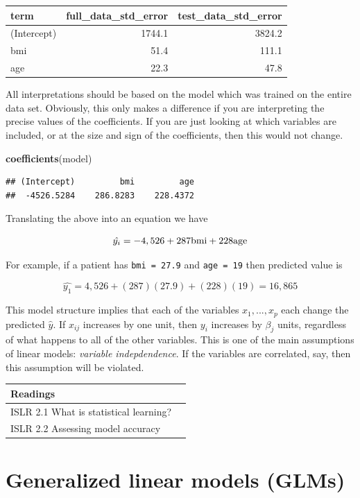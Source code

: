 \documentclass[openany]{book}
\newenvironment{Shaded}{\begin{snugshade}}{\end{snugshade}}
\newcommand{\KeywordTok}[1]{\textcolor[rgb]{0.13,0.29,0.53}{\textbf{#1}}}
\newcommand{\NormalTok}[1]{#1}
\begin{document}
\begin{longtable}[]{@{}lrr@{}}
\toprule
term & full\_data\_std\_error & test\_data\_std\_error\tabularnewline
\midrule
\endhead
(Intercept) & 1744.1 & 3824.2\tabularnewline
bmi & 51.4 & 111.1\tabularnewline
age & 22.3 & 47.8\tabularnewline
\bottomrule
\end{longtable}

All interpretations should be based on the model which was trained on the entire data set. Obviously, this only makes a difference if you are interpreting the precise values of the coefficients. If you are just looking at which variables are included, or at the size and sign of the coefficients, then this would not change.

\begin{Shaded}
\begin{Highlighting}[]
\KeywordTok{coefficients}\NormalTok{(model)}
\end{Highlighting}
\end{Shaded}

\begin{verbatim}
## (Intercept)         bmi         age 
##  -4526.5284    286.8283    228.4372
\end{verbatim}

Translating the above into an equation we have

\[\hat{y_i} = -4,526 + 287 \space\text{bmi} + 228\space \text{age}\]

For example, if a patient has \texttt{bmi\ =\ 27.9} and \texttt{age\ =\ 19} then predicted value is

\[\hat{y_1} = 4,526 + (287)(27.9) + (228)(19) = 16,865\]

This model structure implies that each of the variables \(x_1, ..., x_p\) each change the predicted \(\hat{y}\). If \(x_{ij}\) increases by one unit, then \(y_i\) increases by \(\beta_j\) units, regardless of what happens to all of the other variables. This is one of the main assumptions of linear models: \emph{variable indepdendence}. If the variables are correlated, say, then this assumption will be violated.

\begin{longtable}[]{@{}ll@{}}
\toprule
Readings &\tabularnewline
\midrule
\endhead
ISLR 2.1 What is statistical learning? &\tabularnewline
ISLR 2.2 Assessing model accuracy &\tabularnewline
\bottomrule
\end{longtable}

\hypertarget{generalized-linear-models-glms}{%
\chapter{Generalized linear models (GLMs)}\label{generalized-linear-models-glms}}
\end{document}
